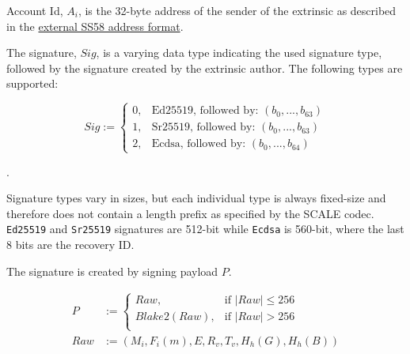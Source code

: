 \begin{definition}
    \label{defn-extrinsic-address}
    Account Id, $A_i$, is the 32-byte address of the sender of the extrinsic as
    described in the
    \href{https://github.com/paritytech/substrate/wiki/External-Address-Format-(SS58)}{external
    SS58 address format}.
\end{definition}

\begin{definition}
    \label{defn-extrinsic-signature}
    The signature, $Sig$, is a varying data type indicating the used signature
    type, followed by the signature created by the extrinsic author. The
    following types are supported:

    \[
        Sig :=
        \begin{cases}
        0, & \text{Ed25519, followed by: } (b_0, ...,b_{63}) \\
        1, & \text{Sr25519, followed by: } (b_0, ...,b_{63}) \\
        2, & \text{Ecdsa, followed by: } (b_0, ...,b_{64})
        \end{cases}
    \]

    .
    \newline

    Signature types vary in sizes, but each individual type is always fixed-size
    and therefore does not contain a length prefix as specified by the SCALE
    codec. \verb|Ed25519| and \verb|Sr25519| signatures are 512-bit while
    \verb|Ecdsa| is 560-bit, where the last 8 bits are the recovery ID.
    \newline

    The signature is created by signing payload $P$.

    \begin{equation}
        \begin{aligned}
        P &:= \begin{cases}
            Raw, & \text{if } |Raw| \leq 256\\
            Blake2(Raw), & \text{if } |Raw| > 256\\
        \end{cases}\\
        Raw &:= (M_i, F_i(m), E, R_v, T_v, H_h(G), H_h(B))\\
        \end{aligned}
    \end{equation}


\end{definition}
